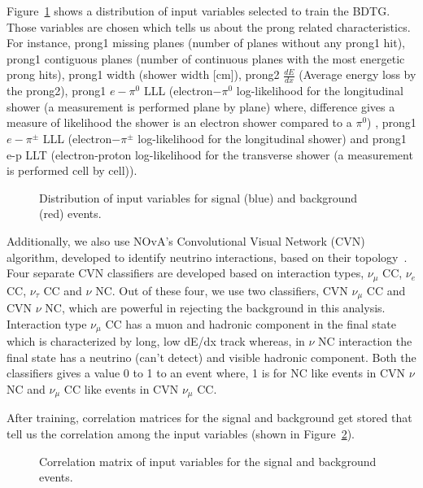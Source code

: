 \documentclass[12pt]{article}
\begin{document}
Figure~\ref{fig:inputvars} shows a distribution of input variables selected to train the BDTG. Those variables are chosen which tells us about the prong related characteristics. For instance, prong1 missing planes (number of planes without any prong1 hit), prong1 contiguous planes (number of continuous planes with the most energetic prong hits), prong1 width (shower width [cm]), prong2 $\frac{dE}{dx}$ (Average energy loss by the prong2), prong1 $e-\pi^{0}$ LLL (electron$-\pi^{0}$  log-likelihood for the longitudinal shower (a measurement is performed plane by plane) where, difference gives a measure of likelihood the shower is an electron shower compared to a $\pi^{0}$) , prong1 $e-\pi^{\pm}$ LLL (electron$-\pi^{\pm}$ log-likelihood for the longitudinal shower) and prong1 e-p LLT (electron-proton log-likelihood for the transverse shower (a measurement is performed cell by cell)). 
 
 \begin{figure}[htb]
\begin{center}
\caption{Distribution of input variables for signal (blue) and background (red) events.}
\label{fig:inputvars}
\end{center}
\end{figure}
 
Additionally, we also use NOvA's Convolutional Visual Network (CVN) algorithm, developed to identify neutrino interactions, based on their topology~\cite{Aurisano}. Four separate CVN classifiers are developed based on interaction types, $\nu_{\mu}$ CC, $\nu_{e}$ CC, $\nu_{\tau}$ CC and $\nu$ NC. Out of these four, we use two classifiers, CVN $\nu_{\mu}$ CC and CVN $\nu$ NC, which are powerful in rejecting the background in this analysis. Interaction type $\nu_{\mu}$ CC has a muon and hadronic component in the final state which is characterized by long, low dE/dx track whereas, in $\nu$ NC interaction the final state has a neutrino (can't detect) and visible hadronic component.  Both the classifiers gives a value 0 to 1 to an event where, 1 is for NC like events in CVN $\nu$ NC and $\nu_{\mu}$ CC like events in CVN $\nu_{\mu}$ CC.

 After training, correlation matrices for the signal and background get stored that tell us the correlation among the input variables (shown in Figure~\ref{fig:cormatrix}). 

\begin{figure}[htb]
\begin{center}
\caption{Correlation matrix of input variables for the signal and background events.}
\label{fig:cormatrix}
\end{center}
\end{figure}
\end{document}
